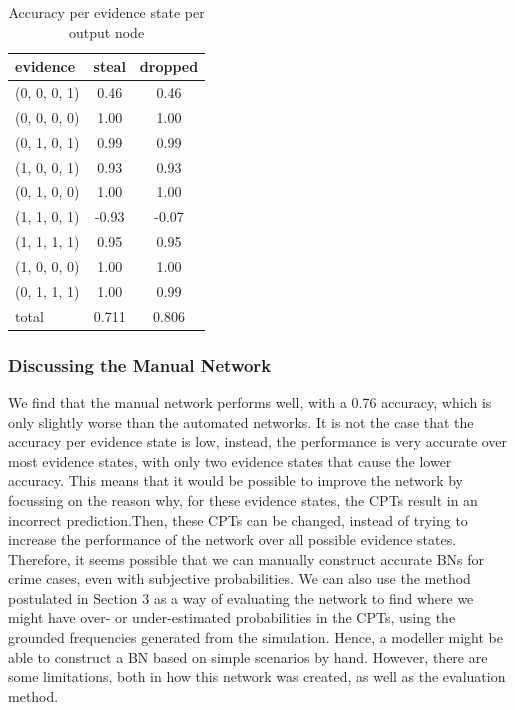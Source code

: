 \documentclass[12pt]{article}
\begin{document}
\begin{table}[htbp]
\begin{center}
\begin{tabular}{|l|c|c|}
\hline
evidence & steal & dropped  \\
\hline
(0, 0, 0, 1) & 0.46 & 0.46  \\
(0, 0, 0, 0) & 1.00 & 1.00 \\
(0, 1, 0, 1) & 0.99 & 0.99 \\
(1, 0, 0, 1) & 0.93 & 0.93 \\
(0, 1, 0, 0) & 1.00 & 1.00 \\
(1, 1, 0, 1) & -0.93 & -0.07\\
(1, 1, 1, 1) & 0.95 & 0.95\\
(1, 0, 0, 0) & 1.00 & 1.00 \\
(0, 1, 1, 1) & 1.00 & 0.99\\
\hline
total & 0.711 &  0.806  \\
\hline
\end{tabular}
\end{center}
\caption{Accuracy per evidence state per output node}
\label{now}
\end{table}

 \subsubsection{Discussing the Manual Network}
 
We find that the manual network performs well, with a 0.76 accuracy, which is only slightly worse than the automated networks. It is not the case that the accuracy per evidence state is low, instead, the performance is very accurate over most evidence states, with only two evidence states that cause the lower accuracy. This means that it would be possible to improve the network by focussing on the reason why, for these evidence states, the CPTs result in an incorrect prediction.Then, these CPTs can be changed, instead of trying to increase the performance of the network over all possible evidence states. Therefore, it seems possible that we can manually construct accurate BNs for crime cases, even with subjective probabilities. We can also use the method postulated in Section 3 as a way of evaluating the network to find where we might have over- or under-estimated probabilities in the CPTs, using the grounded frequencies generated from the simulation. Hence, a modeller might be able to construct a BN based on simple scenarios by hand. However, there are some limitations, both in how this network was created, as well as the evaluation method.
\end{document}
